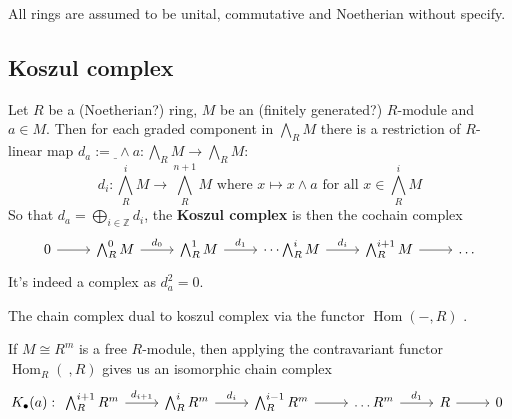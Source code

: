 All rings are assumed to be unital, commutative and Noetherian without specify.

\subsection{Koszul complex}

\begin{definition}



\begin{definition}
	\label{def:minimal_free_resl}
\end{definition}


\begin{proposition}
	\label{prop:loc_resl_min_iff_basis_to_gen}
\end{proposition}


\begin{definition}[KoszulComplex]
	\label{def:KoszulComplex}
	\leanok
	Let $R$ be a (Noetherian?) ring, $M$ be an (finitely generated?) $R$-module and $a \in M$.
	Then for each graded component in $\bigwedge_R M$ there is a restriction of $R$-linear map $d_a := \underline{\ } \wedge a: \bigwedge_R M \to \bigwedge_R M$:
	$$d_i: \bigwedge_R^i M \to \bigwedge_R^{n+1}M \text{ where } x \mapsto x \wedge a \text{ for all } x \in \bigwedge_{R}^i M$$
	So that $d_a = \bigoplus_{i \in \mathbb{Z}}d_i$, the \textbf{Koszul complex} is then the cochain complex
	$$\begin{tikzcd}
		0 \arrow[r] & \bigwedge^{0}_R M \arrow[r, "d_{0}"] & \bigwedge^1_R M \arrow[r, "d_1"] & \dots \bigwedge_R^i M\arrow[r, "d_i"] & \bigwedge_R^{i+1} M \arrow[r] & \dots
	\end{tikzcd}$$
	It's indeed a complex as $d_a^2 = 0$.
\end{definition}

\begin{definition}
	\label{def:DualKoszulComplex}
	\leanok
	The chain complex dual to koszul complex via the functor $\operatorname{Hom}(-,R)$ .
\end{definition}

\begin{proposition}
	\label{prop:free_koszul_is_iso_to_dual}
	If $M \cong R^m$ is a free $R$-module, then applying the contravariant functor $\operatorname{Hom}_R(\ , R)$ gives us an isomorphic chain complex 
	$$K_{\bullet}(a) :\begin{tikzcd}
	\bigwedge^{i+1}_R R^m \arrow[r, "d_{i+1}"] & \bigwedge^i_R R^m \arrow[r, "d_i"] & \bigwedge^{i-1}_R R^m \arrow[r] & \dots R^m \arrow[r, "d_1"] & R \arrow[r] & 0
	\end{tikzcd}$$
\end{proposition}


\end{definition}
